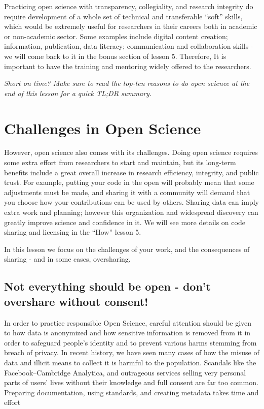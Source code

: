\documentclass[
  letterpaper,
  DIV=11,
  numbers=noendperiod]{scrreport}
\begin{document}
Practicing open science with transparency, collegiality, and research
integrity do require development of a whole set of technical and
transferable ``soft'' skills, which would be extremely useful for
researchers in their careers both in academic or non-academic sector.
Some examples include digital content creation; information,
publication, data literacy; communication and collaboration skills - we
will come back to it in the bonus section of lesson 5. Therefore, It is
important to have the training and mentoring widely offered to the
researchers.

\emph{Short on time? Make sure to read the top-ten reasons to do open
science at the end of this lesson for a quick TL;DR summary.}

\hypertarget{challenges-in-open-science}{%
\section{Challenges in Open Science}\label{challenges-in-open-science}}

However, open science also comes with its challenges. Doing open science
requires some extra effort from researchers to start and maintain, but
its long-term benefits include a great overall increase in research
efficiency, integrity, and public trust. For example, putting your code
in the open will probably mean that some adjustments must be made, and
sharing it with a community will demand that you choose how your
contributions can be used by others. Sharing data can imply extra work
and planning; however this organization and widespread discovery can
greatly improve science and confidence in it. We will see more details
on code sharing and licensing in the ``How'' lesson 5.

In this lesson we focus on the challenges of your work, and the
consequences of sharing - and in some cases, oversharing.

\hypertarget{not-everything-should-be-open---dont-overshare-without-consent}{%
\subsection{Not everything should be open - don't overshare without
consent!}\label{not-everything-should-be-open---dont-overshare-without-consent}}

In order to practice responsible Open Science, careful attention should
be given to how data is anonymized and how sensitive information is
removed from it in order to safeguard people's identity and to prevent
various harms stemming from breach of privacy. In recent history, we
have seen many cases of how the misuse of data and illicit means to
collect it is harmful to the population. Scandals like the
Facebook--Cambridge Analytica, and outrageous services selling very
personal parts of users' lives without their knowledge and full consent
are far too common. Preparing documentation, using standards, and
creating metadata takes time and effort
\end{document}
